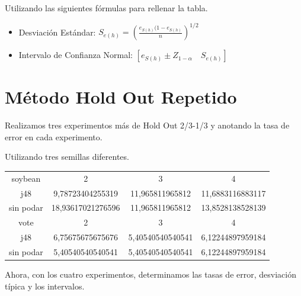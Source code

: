 \documentclass{article}
\begin{document}
Utilizando las siguientes fórmulas para rellenar la tabla.
\begin{itemize}
	\item Desviación Estándar:	 $S_{e(h)} = (\frac{e_{S(h)}(1-e_{S(h)}}{n})^{1/2}$
	\item Intervalo de Confianza Normal:	$[e_{S(h)}\pm Z_{1-\alpha}\quad S_{e(h)}]$
\end{itemize}
 
\newpage

\section{Método Hold Out Repetido}
Realizamos tres experimentos más de Hold Out 2/3-1/3 y anotando la tasa de error en cada experimento.

\hspace{0.5cm} Utilizando tres semillas diferentes.\\

\begin{table}[h]
	\begin{adjustbox}{center}
	\begin{tabular}{|c|c|c|c|}
		\hline
		\rowcolor[gray]{0.8}
		\multicolumn{4}{|c|}{\textbf{Porcentaje}}\\ \hline
		
		\rowcolor[gray]{0.8}
		soybean & 2 & 3 & 4 \\ \hline
		
		j48 & 9,78723404255319 & 11,965811965812 & 11,6883116883117 \\ \hline 
		
		sin podar & 18,93617021276596 & 11,965811965812 & 13,8528138528139 \\ \hline

		\rowcolor[gray]{0.8}
		vote & 2 & 3 & 4 \\ \hline	
		
		j48 & 6,75675675675676 & 5,40540540540541 & 6,12244897959184 \\ \hline
		
		sin podar & 5,40540540540541 & 5,40540540540541 & 6,12244897959184\\ \hline
	\end{tabular}
	\end{adjustbox}
\end{table}

\vspace{1cm}

Ahora, con los cuatro experimentos, determinamos las tasas de error, desviación típica y los intervalos.
\end{document}
